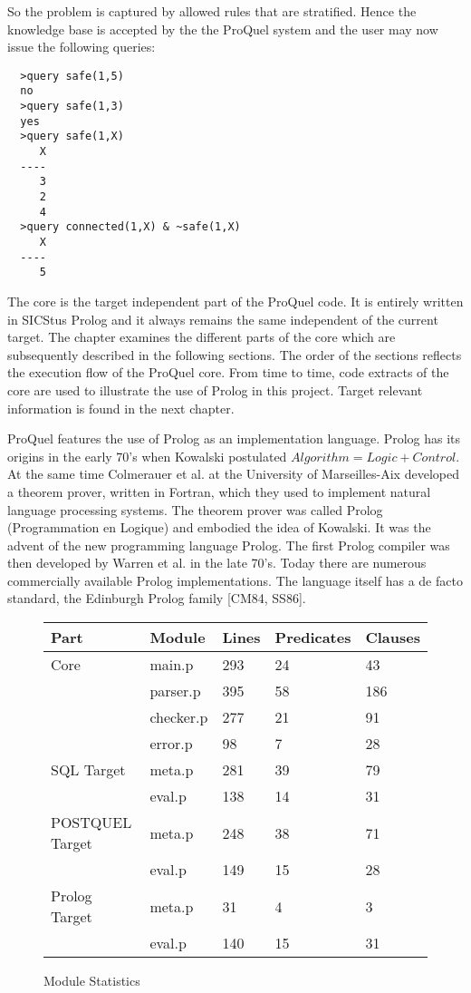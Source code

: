 So the problem is captured by allowed rules that are stratified. Hence the knowledge base
is accepted by the the ProQuel system and the user may now issue the following queries:

\begin{verbatim}
  >query safe(1,5)
  no
  >query safe(1,3)
  yes
  >query safe(1,X)
     X
  ----
     3
     2
     4
  >query connected(1,X) & ~safe(1,X)
     X
  ----
     5
\end{verbatim}

\label{chapcore}
The core is the target independent part of the ProQuel code. It is entirely written in SICStus
Prolog and it always remains the same independent of the current target. The chapter examines the
different parts of the core which are subsequently described in the following sections. The
order of the sections reflects the execution flow of the ProQuel core. From time to time, code 
extracts of the core are used to illustrate the use of Prolog in this project. Target relevant
information is found in the next chapter.

\label{secprolog}
ProQuel features the use of Prolog as an implementation language. Prolog has its origins in
the early 70's when Kowalski postulated $Algorithm = Logic + Control$. At the same time Colmerauer 
et al. at the University of Marseilles-Aix developed a  theorem prover, written in 
Fortran, which they used to implement natural language processing systems. The theorem prover 
was called Prolog (Programmation en Logique) and embodied the idea of Kowalski. It was the
advent of the new programming language Prolog. The first Prolog compiler was then developed by 
Warren et al. in the late 70's. Today there are numerous commercially available Prolog 
implementations. The language itself has a de facto standard, the Edinburgh Prolog 
family [CM84, SS86].   

\begin{figure}
\begin{center}
\begin{tabular}{l|llll}
Part & Module & Lines & Predicates & Clauses \\
\hline
Core & main.p & 293 & 24 & 43 \\
& parser.p & 395 & 58 & 186 \\
& checker.p & 277 & 21 & 91 \\
& error.p & 98 & 7 & 28 \\
\hline
SQL Target & meta.p & 281 & 39 & 79 \\
& eval.p & 138 & 14 & 31 \\
\hline
POSTQUEL Target & meta.p & 248 & 38 & 71 \\
& eval.p & 149 & 15 & 28 \\
\hline
Prolog Target & meta.p & 31 & 4 & 3 \\
& eval.p & 140 & 15 & 31
\end{tabular}
\end{center}
\caption{Module Statistics}
\label{modstat}
\end{figure}

